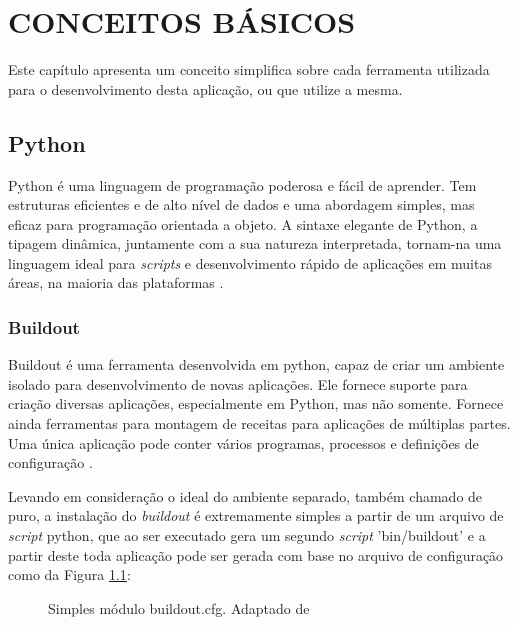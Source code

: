 \chapter{CONCEITOS BÁSICOS}

Este capítulo apresenta um conceito simplifica sobre cada ferramenta utilizada para o desenvolvimento desta aplicação, ou que utilize a mesma.

\section{Python}

Python é uma linguagem de programação poderosa e fácil de aprender. Tem estruturas eficientes e de alto nível de dados e uma abordagem simples, mas eficaz para programação orientada a objeto. A sintaxe elegante de Python, a tipagem dinâmica, juntamente com a sua natureza interpretada, tornam-na uma linguagem ideal para \textit{scripts} e desenvolvimento rápido de aplicações em muitas áreas, na maioria das plataformas \cite{GUIDO}.

\subsection{Buildout}

Buildout é uma ferramenta desenvolvida em python, capaz de criar um ambiente isolado para desenvolvimento de novas aplicações. Ele fornece suporte para criação diversas aplicações, especialmente em Python, mas não somente. Fornece ainda ferramentas para montagem de receitas para aplicações de múltiplas partes. Uma única aplicação pode conter vários programas, processos e definições de configuração \cite{BRANDOM}.

Levando em consideração o ideal do ambiente separado, também chamado de puro, a instalação do \textit{buildout} é extremamente simples a partir de um arquivo de \textit{script} python, que ao ser executado gera um segundo \textit{script} 'bin/buildout' e a partir deste toda aplicação pode ser gerada com base no arquivo de configuração como da Figura \ref{buildout}:

\begin{figure}[ht]
    \centering
    \caption{Simples módulo buildout.cfg. Adaptado de \cite{ZOPE-FOUNDATION-BUILDOUT}}
    \label{buildout}
\end{figure}

